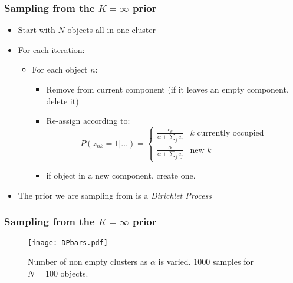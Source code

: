 \begin{frame}
	\frametitle{Sampling from the $K=\infty$ prior}
	\begin{itemize}
		\item Start with $N$ objects all in one cluster
		\item For each iteration:
		\begin{itemize}
			\item For each object $n$:
			\begin{itemize}
				\item Remove from current component (if it leaves an empty component, delete it)
				\item Re-assign according to:
				\[
					P(z_{nk}=1|\ldots) = \left\{ \begin{array}{ll}
						\frac{c_k}{\alpha + \sum_j c_j} & \mbox{$k$ currently occupied}\\
						\frac{\alpha}{\alpha + \sum_j c_j} & \mbox{new $k$}
					\end{array}\right.
				\]
				\item if object in a new component, create one.
			\end{itemize}
		\end{itemize}
		\item<2->The prior we are sampling from is a \emph{Dirichlet Process}
	\end{itemize}
\end{frame}

\begin{frame}
	\frametitle{Sampling from the $K=\infty$ prior}
	\begin{figure}[tbh]
		\centering\texttt{[image: DPbars.pdf]}
		\centering\caption{\label{fig:DPbars}Number of non empty clusters as $\alpha$ is varied. $1000$ samples for $N=100$ objects.}
	\end{figure}
\end{frame}

